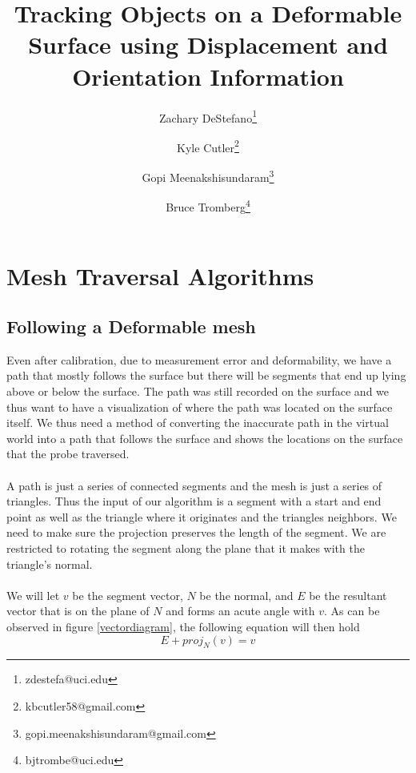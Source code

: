 \documentclass[conference]{acmsiggraph}
\title{Tracking Objects on a Deformable Surface using Displacement and Orientation Information}
\author[1]{Zachary DeStefano\thanks{zdestefa@uci.edu}}
\author[1]{Kyle Cutler\thanks{kbcutler58@gmail.com}}
\author[1]{Gopi Meenakshisundaram\thanks{gopi.meenakshisundaram@gmail.com}}
\author[1]{Bruce Tromberg\thanks{bjtrombe@uci.edu}}
\affil[1]{University of California, Irvine}
\begin{document}

\maketitle



\section{Mesh Traversal Algorithms}

\subsection{Following a Deformable mesh}

Even after calibration, due to measurement error and deformability, we have a path that mostly follows the surface but there will be segments that end up lying above or below the surface. The path was still recorded on the surface and we thus want to have a visualization of where the path was located on the surface itself. We thus need a method of converting the inaccurate path in the virtual world into a path that follows the surface and shows the locations on the surface that the probe traversed. \\
\\
A path is just a series of connected segments and the mesh is just a series of triangles. Thus the input of our algorithm is a segment with a start and end point as well as the triangle where it originates and the triangles neighbors. We need to make sure the projection preserves the length of the segment. We are restricted to rotating the segment along the plane that it makes with the triangle's normal. \\
\\
We will let $v$ be the segment vector, $N$ be the normal, and $E$ be the resultant vector that is on the plane of $N$ and forms an acute angle with $v$. As can be observed in figure \ref{vectordiagram}, the following equation will then hold
\[
E + proj_N(v) = v
\]
\end{document}

